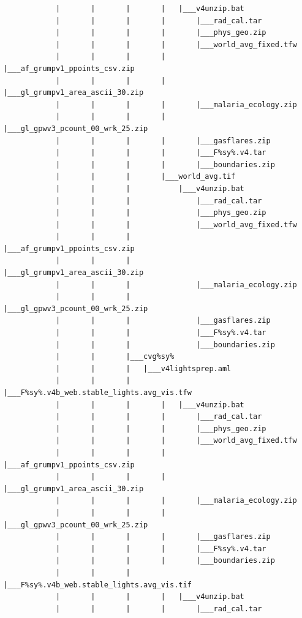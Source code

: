 \documentclass[
]{book}
\begin{document}
\begin{verbatim}
            |       |       |       |   |___v4unzip.bat
            |       |       |       |       |___rad_cal.tar
            |       |       |       |       |___phys_geo.zip
            |       |       |       |       |___world_avg_fixed.tfw
            |       |       |       |       |___af_grumpv1_ppoints_csv.zip
            |       |       |       |       |___gl_grumpv1_area_ascii_30.zip
            |       |       |       |       |___malaria_ecology.zip
            |       |       |       |       |___gl_gpwv3_pcount_00_wrk_25.zip
            |       |       |       |       |___gasflares.zip
            |       |       |       |       |___F%sy%.v4.tar
            |       |       |       |       |___boundaries.zip
            |       |       |       |___world_avg.tif
            |       |       |           |___v4unzip.bat
            |       |       |               |___rad_cal.tar
            |       |       |               |___phys_geo.zip
            |       |       |               |___world_avg_fixed.tfw
            |       |       |               |___af_grumpv1_ppoints_csv.zip
            |       |       |               |___gl_grumpv1_area_ascii_30.zip
            |       |       |               |___malaria_ecology.zip
            |       |       |               |___gl_gpwv3_pcount_00_wrk_25.zip
            |       |       |               |___gasflares.zip
            |       |       |               |___F%sy%.v4.tar
            |       |       |               |___boundaries.zip
            |       |       |___cvg%sy%
            |       |       |   |___v4lightsprep.aml
            |       |       |       |___F%sy%.v4b_web.stable_lights.avg_vis.tfw
            |       |       |       |   |___v4unzip.bat
            |       |       |       |       |___rad_cal.tar
            |       |       |       |       |___phys_geo.zip
            |       |       |       |       |___world_avg_fixed.tfw
            |       |       |       |       |___af_grumpv1_ppoints_csv.zip
            |       |       |       |       |___gl_grumpv1_area_ascii_30.zip
            |       |       |       |       |___malaria_ecology.zip
            |       |       |       |       |___gl_gpwv3_pcount_00_wrk_25.zip
            |       |       |       |       |___gasflares.zip
            |       |       |       |       |___F%sy%.v4.tar
            |       |       |       |       |___boundaries.zip
            |       |       |       |___F%sy%.v4b_web.stable_lights.avg_vis.tif
            |       |       |       |   |___v4unzip.bat
            |       |       |       |       |___rad_cal.tar

\end{verbatim}
\end{document}
